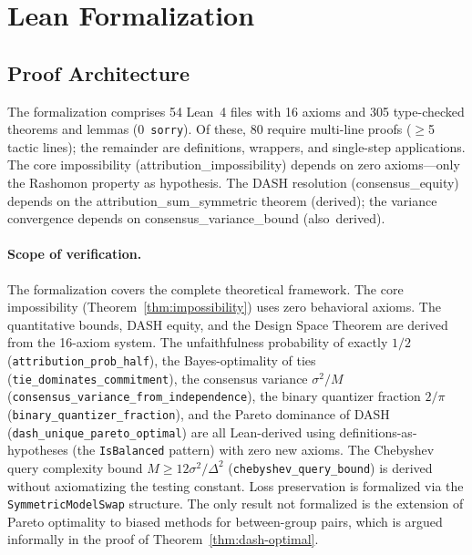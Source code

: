 \documentclass{jmlr}
\begin{document}

\section{Lean Formalization}
\label{sec:lean}

\subsection{Proof Architecture}

The formalization comprises 54 Lean~4 files with 16 axioms and 305 type-checked theorems and lemmas (0~\texttt{sorry}). Of these, 80 require multi-line proofs ($\geq$5 tactic lines); the remainder are definitions, wrappers, and single-step applications.
The core impossibility (\textsf{attribution\_impossibility}) depends on zero axioms---only the Rashomon property as hypothesis.
The DASH resolution (\textsf{consensus\_equity}) depends on the \textsf{attribution\_sum\_symmetric} theorem (derived); the variance convergence depends on \textsf{consensus\_variance\_bound} (also~derived).

\paragraph{Scope of verification.}
\begin{sloppypar}
The formalization covers the complete theoretical framework. The core impossibility (Theorem~\ref{thm:impossibility}) uses zero behavioral axioms. The quantitative bounds, DASH equity, and the Design Space Theorem are derived from the 16-axiom system. The unfaithfulness probability of exactly $1/2$ (\texttt{attribution\_prob\_half}), the Bayes-optimality of ties (\texttt{tie\_dominates\_commitment}), the consensus variance $\sigma^2/M$ (\texttt{consensus\_variance\_from\_independence}), the binary quantizer fraction $2/\pi$ (\texttt{binary\_quantizer\_fraction}), and the Pareto dominance of DASH (\texttt{dash\_unique\_pareto\_optimal}) are all Lean-derived using definitions-as-hypotheses (the \texttt{IsBalanced} pattern) with zero new axioms. The Chebyshev query complexity bound $M \geq 12\sigma^2/\Delta^2$ (\texttt{chebyshev\_query\_bound}) is derived without axiomatizing the testing constant. Loss preservation is formalized via the \texttt{SymmetricModelSwap} structure. The only result not formalized is the extension of Pareto optimality to biased methods for between-group pairs, which is argued informally in the proof of Theorem~\ref{thm:dash-optimal}.
\end{sloppypar}
\end{document}
